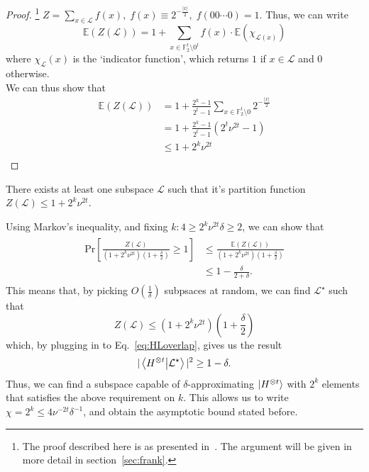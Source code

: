 \documentclass{standalone}
\begin{document}
\begin{proof}\footnote{The proof described here is as presented in~\cite{Bravyi2016b}. The argument will be given in more detail in section~\ref{sec:frank}.}
    $Z = \sum_{x\in\mathcal{L}}f(x),\;f(x)\equiv 2^{-\frac{\vert x\vert}{2}},\; f(00\cdots 0)=1$. Thus, we can write
    \[\mathbb{E}(Z(\mathcal{L})) = 1+\sum_{x\in\mathbb{F}_{2}^{t}\setminus 0^{t}}f(x)\cdot \mathbb{E}\left(\chi_{\mathcal{L}(x)}\right)\]
    where $\chi_{\mathcal{L}}(x)$ is the `indicator function', which returns $1$ if $x\in\mathcal{L}$ and $0$ otherwise. \\
    We can thus show that
    \begin{align*}
        \mathbb{E}\left(Z(\mathcal{L})\right) 
        &= 1+\frac{2^k-1}{2^t-1}\sum_{x\in\mathbb{F}_{2}^{t}\setminus 0}2^{-\frac{\vert x\vert}{2}}\\
        &=1+\frac{2^k-1}{2^t-1}\left(2^t\nu^{2t}-1\right)\\
        &\leq 1+2^{k}\nu^{2t}\\
    \end{align*}
\end{proof}
\begin{cor}
There exists at least one subspace $\mathcal{L}$ such that it's partition function $Z(\mathcal{L})\leq1+2^{k}\nu^{2t}$.
\end{cor}
Using Markov's inequality, and fixing $k: 4\geq 2^{k}\nu^{2t}\delta\geq 2$, we can show that
\begin{align}\label{eq:markovineq}
\begin{split}
\text{Pr}[\frac{Z(\mathcal{L})}{(1+2^{k}\nu^{2t})(1+\frac{\delta}{2})}\geq 1] 
&\leq \frac{\mathbb{E}(Z(\mathcal{L}))}{(1+2^{k}\nu^{2t})(1+\frac{\delta}{2})} \\
&\leq 1-\frac{\delta}{2+\delta}.
\end{split}
\end{align}
This means that, by picking $O(\frac{1}{\delta})$ subpsaces at random, we can find $\mathcal{L}^{\star}$ such that
\begin{equation}
    Z(\mathcal{L}) \leq (1+2^{k}\nu^{2t})(1+\frac{\delta}{2})
\end{equation}
which, by plugging in to Eq.~\ref{eq:HLoverlap}, gives us the result
\begin{equation}
    \vert\braket{H^{\otimes t}}{\mathcal{L}^{\star}}\vert^{2}\geq 1-\delta.
\end{equation}
Thus, we can find a subspace capable of $\delta$-approximating $\ket{H^{\otimes t}}$ with $2^{k}$ elements that satisfies the above requirement on $k$. This allows us to write $\chi = 2^{k} \leq 4\nu^{-2t}\delta^{-1}$, and obtain the asymptotic bound stated before.
\end{document}

